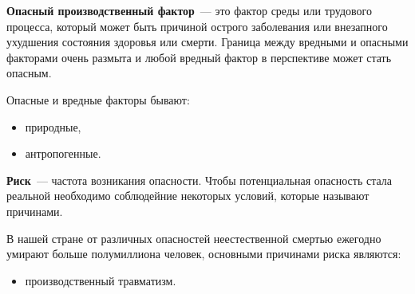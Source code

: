 \textbf{Опасный производственный фактор}~--- это фактор среды или трудового процесса, который может быть причиной острого заболевания или внезапного ухудшения состояния здоровья или смерти. Граница между вредными и опасными факторами очень размыта и любой вредный фактор в перспективе может стать опасным.

Опасные и вредные факторы бывают:
\begin{itemize}
\item природные,
\item антропогенные.
\end{itemize}

\textbf{Риск}~--- частота возникания опасности. Чтобы потенциальная опасность стала реальной необходимо соблюдейние некоторых условий, которые называют причинами.

В нашей стране от различных опасностей неестественной смертью ежегодно умирают больше полумиллиона человек, основными причинами риска являются:
\begin{itemize}
\item производственный травматизм.
\end{itemize}
